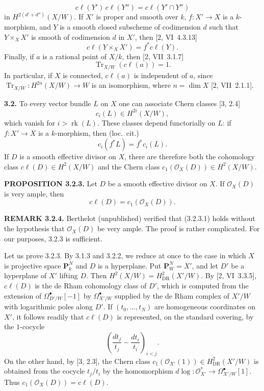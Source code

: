 \documentclass[10pt]{article}
\begin{document}
\begin{equation}\tag{3.1.2}
c\ell(Y')\,c\ell(Y'')=c\ell(Y'\cap Y'')
\end{equation}
in $H^{2(d'+d'')}(X/W)$. If $X'$ is proper and smooth over $k$, $f:X'\to X$ is a $k$-morphism, and $Y$ is a smooth closed subscheme of codimension $d$ such that $Y\times_X X'$ is smooth of codimension $d$ in $X'$, then [2, VI~4.3.13]
\begin{equation}\tag{3.1.3}
c\ell(Y\times_X X')=f^*c\ell(Y).
\end{equation}
Finally, if $a$ is a rational point of $X/k$, then [2, VII~3.1.7]
\begin{equation}\tag{3.1.4}
\operatorname{Tr}_{X/W}(c\ell(a))=1.
\end{equation}
In particular, if $X$ is connected, $c\ell(a)$ is independent of $a$, since
$\operatorname{Tr}_{X/W}:H^{2n}(X/W)\to W$ is an isomorphism, where $n=\dim X$ [2, VII~2.1.1].

\noindent\textbf{3.2.} To every vector bundle $L$ on $X$ one can associate Chern classes [3, 2.4]
\begin{equation}\tag{3.2.1}
c_i(L)\in H^{2i}(X/W),
\end{equation}
which vanish for $i>\operatorname{rk}(L)$. These classes depend functorially on $L$: if $f:X'\to X$ is a $k$-morphism, then (loc.~cit.)
\begin{equation}\tag{3.2.2}
c_i(f^*L)=f^*c_i(L).
\end{equation}
If $D$ is a smooth effective divisor on $X$, there are therefore both the cohomology class $c\ell(D)\in H^2(X/W)$ and the Chern class $c_1(\mathcal O_X(D))\in H^2(X/W)$.

\noindent\textbf{PROPOSITION 3.2.3.} Let $D$ be a smooth effective divisor on $X$. If $\mathcal O_X(D)$ is very ample, then
\begin{equation}\tag{3.2.3.1}
c\ell(D)=c_1(\mathcal O_X(D)).
\end{equation}

\noindent\textbf{REMARK 3.2.4.} Berthelot (unpublished) verified that (3.2.3.1) holds without the hypothesis that $\mathcal O_X(D)$ be very ample. The proof is rather complicated. For our purposes, 3.2.3 is sufficient.
\newpage
\setcounter{footnote}{0}
\fontsize{10.2pt}{12.04pt}\selectfont

Let us prove 3.2.3. By 3.1.3 and 3.2.2, we reduce at once to the case in which $X$ is projective space $\mathbf P^N_k$ and $D$ is a hyperplane. Put $\mathbf P^N_W=X'$, and let $D'$ be a hyperplane of $X'$ lifting $D$. Then $H^2(X/W)=H^2_{\mathrm{DR}}(X'/W)$. By [2, VI~3.3.5], $c\ell(D)$ is the de Rham cohomology class of $D'$, which is computed from the extension of $\Omega^\bullet_{D'/W}[-1]$ by $\Omega^\bullet_{X'/W}$ supplied by the de Rham complex of $X'/W$ with logarithmic poles along $D'$. If $(t_0,\ldots,t_N)$ are homogeneous coordinates on $X'$, it follows readily that $c\ell(D)$ is represented, on the standard covering, by the $1$-cocycle
\[
\left(\frac{dt_j}{t_j}-\frac{dt_i}{t_i}\right)_{i<j}.
\]
On the other hand, by [3, 2.3], the Chern class $c_1(\mathcal O_{X'}(1))\in H^2_{\mathrm{DR}}(X'/W)$ is obtained from the cocycle $t_j/t_i$ by the homomorphism
$d\log:\mathcal O_{X'}^*\to\Omega^\bullet_{X'/W}[1]$. Thus $c_1(\mathcal O_X(D))=c\ell(D)$.
\end{document}
